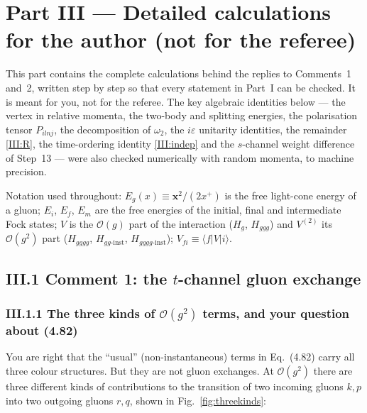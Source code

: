 \section*{Part III --- Detailed calculations for the author (not for the referee)}
\setcounter{equation}{0}
\renewcommand{\theequation}{III.\arabic{equation}}
\newcommand{\bkap}{\boldsymbol\kappa}
\newcommand{\blam}{\boldsymbol\lambda}
\newcommand{\bP}{\mathbf P}

This part contains the complete calculations behind the replies to Comments~1 and~2, written step by step so that every statement in Part~I can be checked. It is meant for you, not for the referee. The key algebraic identities below --- the vertex in relative momenta, the two-body and splitting energies, the polarisation tensor $P_{ilnj}$, the decomposition of $\omega_2$, the $i\varepsilon$ unitarity identities, the remainder \eqref{III:R}, the time-ordering identity \eqref{III:indep} and the $s$-channel weight difference of Step~13 --- were also checked numerically with random momenta, to machine precision.

Notation used throughout: $E_g(x)\equiv \mathbf x^2/(2x^+)$ is the free light-cone energy of a gluon; $E_i$, $E_f$, $E_m$ are the free energies of the initial, final and intermediate Fock states; $V$ is the $\mathcal O(g)$ part of the interaction ($H_g$, $H_{ggg}$) and $V^{(2)}$ its $\mathcal O(g^2)$ part ($H_{gggg}$, $H_{gg\text{-inst}}$, $H_{gggg\text{-inst}}$); $V_{fi}\equiv\langle f|V|i\rangle$.

\subsection*{III.1 Comment 1: the $t$-channel gluon exchange}

\subsubsection*{III.1.1 The three kinds of $\mathcal O(g^2)$ terms, and your question about (4.82)}

You are right that the ``usual'' (non-instantaneous) terms in Eq.~(4.82) carry all three colour structures. But they are not gluon exchanges. At $\mathcal O(g^2)$ there are three different kinds of contributions to the transition of two incoming gluons $k,p$ into two outgoing gluons $r,q$, shown in Fig.~\ref{fig:threekinds}:

